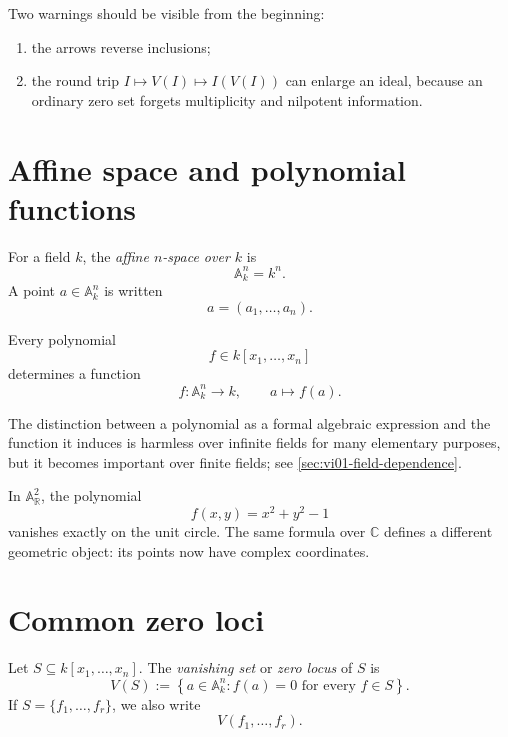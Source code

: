 Two warnings should be visible from the beginning:
\begin{enumerate}
  \item the arrows reverse inclusions;
  \item the round trip \(I\mapsto V(I)\mapsto I(V(I))\) can enlarge an ideal, because
        an ordinary zero set forgets multiplicity and nilpotent information.
\end{enumerate}

\section{Affine space and polynomial functions}
\label{sec:vi01-affine-space}

\begin{definition}
For a field \(k\), the \emph{affine \(n\)-space over \(k\)} is
\[
  \mathbb A_k^n = k^n.
\]
A point \(a\in \mathbb A_k^n\) is written
\[
  a=(a_1,\dots,a_n).
\]
\end{definition}

Every polynomial
\[
  f\in k[x_1,\dots,x_n]
\]
determines a function
\[
  f:\mathbb A_k^n\longrightarrow k,
  \qquad
  a\longmapsto f(a).
\]

The distinction between a polynomial as a formal algebraic expression and the function it
induces is harmless over infinite fields for many elementary purposes, but it becomes
important over finite fields; see \cref{sec:vi01-field-dependence}.

\begin{example}
In \(\mathbb A_{\mathbb R}^2\), the polynomial
\[
  f(x,y)=x^2+y^2-1
\]
vanishes exactly on the unit circle.  The same formula over \(\mathbb C\) defines a
different geometric object: its points now have complex coordinates.
\end{example}

\section{Common zero loci}
\label{sec:vi01-zero-loci}

\begin{definition}
Let \(S\subseteq k[x_1,\dots,x_n]\).  The \emph{vanishing set} or \emph{zero locus} of
\(S\) is
\[
  V(S)
  :=
  \left\{
    a\in\mathbb A_k^n:
    f(a)=0\text{ for every }f\in S
  \right\}.
\]
If \(S=\{f_1,\dots,f_r\}\), we also write
\[
  V(f_1,\dots,f_r).
\]
\end{definition}


